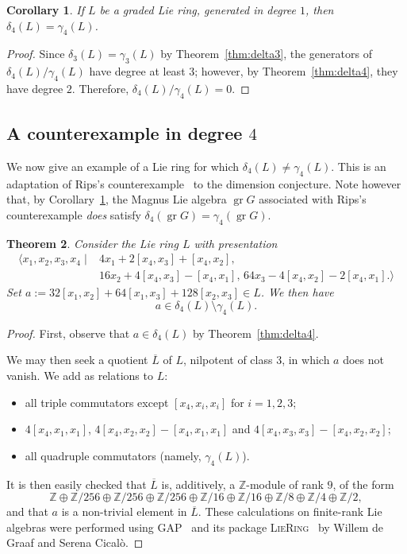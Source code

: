 \documentclass[a4paper,reqno,notitlepage]{amsart}
\newtheorem{theorem}{Theorem}[section]
\newtheorem{cor}[theorem]{Corollary}
\theoremstyle{definition}
\newcommand{\Z}{\mathbb Z}
\newcommand\gr{\operatorname{gr}}
\begin{document}
\begin{cor}\label{cor:graded=ok}
  If $L$ be a graded Lie ring, generated in degree $1$, then
  $\delta_4(L)=\gamma_4(L)$.
\end{cor}
\begin{proof} 
  Since $\delta_3(L)=\gamma_3(L)$ by Theorem~\ref{thm:delta3}, the
  generators of $\delta_4(L)/\gamma_4(L)$ have degree at least $3$;
  however, by Theorem~\ref{thm:delta4}, they have degree
  $2$. Therefore, $\delta_4(L)/\gamma_4(L)=0$.
\end{proof}

\subsection{A counterexample in degree \boldmath $4$}
We now give an example of a Lie ring for which
$\delta_4(L)\neq\gamma_4(L)$. This is an adaptation of Rips's
counterexample~\cite{Rips:72} to the dimension conjecture. Note
however that, by Corollary~\ref{cor:graded=ok}, the Magnus Lie algebra
$\gr G$ associated with Rips's counterexample \emph{does} satisfy
$\delta_4(\gr G)=\gamma_4(\gr G)$.

\begin{theorem}\label{case n=4}
  Consider the  Lie ring $L$ with presentation
  \[\begin{split}
    \langle x_1,x_2,x_3,x_4\mid & 4x_1 + 2[x_4,x_3] + [x_4,x_2],\\
    &  16x_2 + 4[x_4,x_3] - [x_4,x_1],\, 64x_3 - 4[x_4,x_2] - 2[x_4,x_1].\rangle
  \end{split}
  \]
  Set $a:=32[x_1,x_2] + 64 [x_1,x_3] + 128[x_2,x_3]\in L$. We then
  have
  \[a\in\delta_4(L)\setminus\gamma_4(L).\]
\end{theorem}
\begin{proof}
  First, observe that $a\in\delta_4(L)$ by Theorem~\ref{thm:delta4}.

  We may then seek a quotient $\overline L$ of $L$, nilpotent of class
  $3$, in which $a$ does not vanish. We add as relations to $L$:
  \begin{itemize}
  \item all triple commutators except $[x_4,x_i,x_i]$ for $i=1,2,3$;
  \item $4[x_4,x_1,x_1]$, $4[x_4,x_2,x_2]-[x_4,x_1,x_1]$ and
    $4[x_4,x_3,x_3]-[x_4,x_2,x_2]$;
  \item all quadruple commutators (namely, $\gamma_4(L)$).
  \end{itemize}

  It is then easily checked that $\overline L$ is, additively, a
  $\Z$-module of rank $9$, of the form
  \[\Z\oplus\Z/256\oplus\Z/256\oplus\Z/256\oplus\Z/16\oplus\Z/16\oplus\Z/8\oplus\Z/4\oplus\Z/2,\]
  and that $a$ is a non-trivial element in $\overline L$.  These
  calculations on finite-rank Lie algebras were performed using
  GAP~\cite{gap4:manual} and its package
  \textsc{LieRing}~\cite{liering:manual} by Willem de Graaf and Serena
  Cical\`o.
\end{proof}
\end{document}
